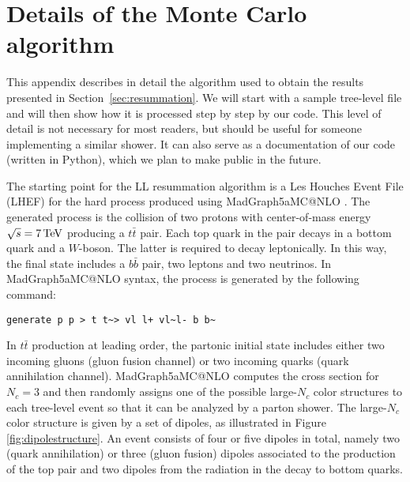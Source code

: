 \documentclass[11pt,a4paper]{article}
\begin{document}
\appendix

\section{Details of the Monte Carlo algorithm \label{sec:MCalg}}
This appendix describes in detail the algorithm used to obtain the results presented in Section~\ref{sec:resummation}. We will start with a sample tree-level file and will then show how it is processed step by step by our code. This level of detail is not necessary for most readers, but should be useful for someone implementing a similar shower. It can also serve as a documentation of our code (written in {\sc Python}), which we plan to make public in the future.

 The starting point for the LL resummation algorithm  is a Les Houches Event File (LHEF) \cite{Alwall:2006yp} for the hard process produced using {\sc MadGraph5\Q{_}aMC@NLO} \cite{Alwall:2014hca}. The generated process is the collision of two protons with center-of-mass energy $\sqrt{s}=7\,{\rm TeV}$ producing a $t\bar{t}$ pair. Each top quark in the pair decays in a bottom quark and a $W$-boson. The latter is required to decay  leptonically. In this way, the final state includes  a $b\bar{b}$ pair, two leptons and two neutrinos. In {\sc MadGraph5\Q{_}aMC@NLO} syntax, the process is generated by the following command:
\begin{center}
{\tt	generate p p > t t\textasciitilde\phantom{a}> vl l+ vl\textasciitilde\phantom{a}l- b b\textasciitilde	}
\end{center}
	In $t\bar{t}$ production at leading order, the partonic initial state includes either two incoming gluons (gluon fusion channel) or two incoming quarks (quark annihilation channel). {\sc MadGraph5\Q{_}aMC@NLO} computes the cross section for $N_c=3$ and then randomly assigns one of the possible large-$N_c$ color structures to each tree-level event so that it can be analyzed by a parton shower. The large-$N_c$ color structure is given by a set of dipoles, as illustrated in Figure \ref{fig:dipolestructure}. An event consists of four or five dipoles in total, namely two (quark annihilation) or three (gluon fusion) dipoles associated to the production of the top pair and two dipoles from the radiation in the decay to bottom quarks.
\end{document}
